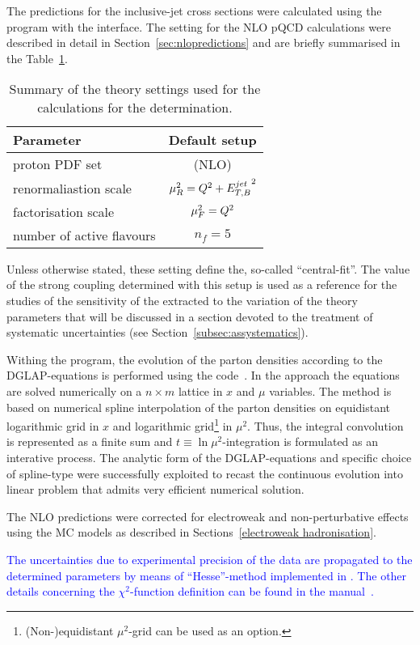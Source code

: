 The predictions for the inclusive-jet cross sections were calculated using the \nlojet program with the \fastnlo interface. The setting for the NLO pQCD calculations were described in detail in Section~\ref{sec:nlopredictions} and are briefly summarised in the Table~\ref{tab:nlosettings}.
\begin{table}[h]
\centering
\begin{tabular}{l|c}
Parameter  & Default setup \\ 
\hline \hline proton PDF set & \herapdf1.5 (NLO) \\
\hline renormaliastion scale & $\mu_R^2=\mbox{${Q^2}$} + \mbox{$E_{T,B}^{jet}$}^2$ \\ 
\hline factorisation scale          & $\mu_F^2=\mbox{${Q^2}$} $ \\ 
\hline number of active flavours    & $n_f = 5 $ \\ 
\end{tabular} 
\caption{Summary of the theory settings used for the calculations for the \as determination.}
\label{tab:nlosettings}
\end{table}
Unless otherwise stated, these setting define the, so-called ``central-fit''. The value of the strong coupling determined with this setup is used as a reference for the studies of the sensitivity of the extracted \asz to the variation of the theory parameters that will be discussed in a section devoted to the treatment of systematic uncertainties (see Section~\ref{subsec:assystematics}).

Withing the \herafitter program, the evolution of the parton densities according to the DGLAP-equations is performed using the \qcdnum code~\cite{Botje:2010ay}. In the \qcdnum approach the equations are solved numerically on a $n\times m$ lattice in $x$ and $\mu$ variables. The method is based on numerical spline interpolation of the parton densities on equidistant logarithmic grid in $x$ and logarithmic grid\footnote{(Non-)equidistant $\mu^2$-grid can be used as an option.} in $\mu^2$. Thus, the integral convolution is represented as a finite sum and $t \equiv \ln{\mu^2}$-integration is formulated as an interative process. The analytic form of the DGLAP-equations and specific choice of spline-type were successfully exploited to recast the continuous evolution into linear problem that admits very efficient numerical solution.

The NLO predictions were corrected for electroweak and non-perturbative effects using the MC models as described in Sections~\ref{electroweak hadronisation}.

\textcolor{blue}{The uncertainties due to experimental precision of the data are propagated to the determined parameters by means of ``Hesse''-method implemented in \minuit. The other details concerning the $\chi^2$-function definition can be found in the \herafitter manual~\cite{herafitter:2014:manual}.}